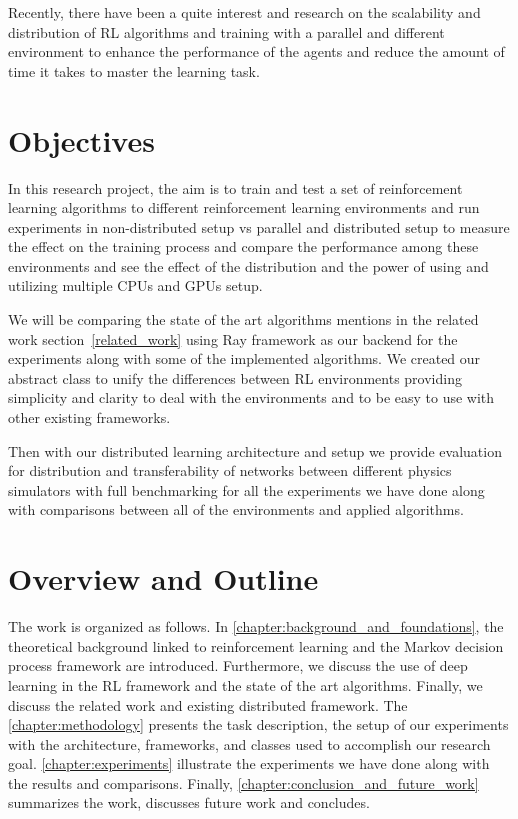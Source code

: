Recently, there have been a quite interest and research on the scalability and distribution of RL algorithms and training with a parallel and different environment to enhance the performance of the agents and reduce the amount of time it takes to master the learning task.

\section{Objectives}
In this research project, the aim is to train and test a set of reinforcement learning algorithms to different reinforcement learning environments and run experiments in non-distributed setup vs parallel and distributed setup to measure the effect on the training process and compare the performance among these environments and see the effect of the distribution and the power of using and utilizing multiple CPUs and GPUs setup. 

We will be comparing the state of the art algorithms mentions in the related work section~\ref{related_work} using Ray framework as our backend for the experiments along with some of the implemented algorithms. We created our abstract class to unify the differences between RL environments providing simplicity and clarity to deal with the environments and to be easy to use with other existing frameworks.

Then with our distributed learning architecture and setup we provide evaluation for distribution and transferability of networks between different physics simulators with full benchmarking for all the experiments we have done along with comparisons between all of the environments and applied algorithms.

\section{Overview and Outline}
The work is organized as follows. In \autoref{chapter:background_and_foundations}, the theoretical background linked to reinforcement learning and the Markov decision process framework are introduced. Furthermore, we discuss the use of deep learning in the RL framework and the state of the art algorithms. Finally, we discuss the related work and existing distributed framework. The \autoref{chapter:methodology} presents the task description, the setup of our experiments with the architecture, frameworks, and classes used to accomplish our research goal. \autoref{chapter:experiments} illustrate the experiments we have done along with the results and comparisons. Finally, \autoref{chapter:conclusion_and_future_work} summarizes the work, discusses future work and concludes.
